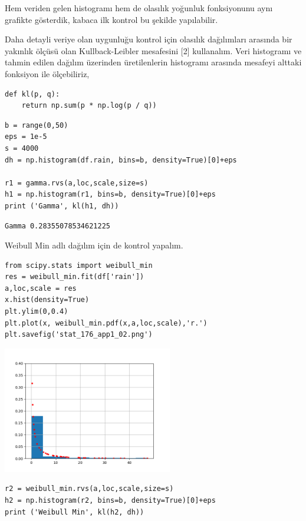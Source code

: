 \documentclass[12pt,fleqn]{article}\usepackage{../../common}
\begin{document}
Hem veriden gelen histogramı hem de olasılık yoğunluk fonksiyonunu aynı
grafikte gösterdik, kabaca ilk kontrol bu şekilde yapılabilir.

Daha detayli veriye olan uygunluğu kontrol için olasılık dağılımları arasında
bir yakınlık ölçüsü olan Kullback-Leibler mesafesini [2] kullanalım. Veri
histogramı ve tahmin edilen dağılım üzerinden üretilenlerin histogramı arasında
mesafeyi alttaki fonksiyon ile ölçebiliriz,

\begin{verbatim}
def kl(p, q):
    return np.sum(p * np.log(p / q))    
\end{verbatim}

\begin{verbatim}
b = range(0,50)
eps = 1e-5
s = 4000
dh = np.histogram(df.rain, bins=b, density=True)[0]+eps

r1 = gamma.rvs(a,loc,scale,size=s)
h1 = np.histogram(r1, bins=b, density=True)[0]+eps
print ('Gamma', kl(h1, dh))
\end{verbatim}

\begin{verbatim}
Gamma 0.28355078534621225
\end{verbatim}

Weibull Min adlı dağılım için de kontrol yapalım.

\begin{verbatim}
from scipy.stats import weibull_min
res = weibull_min.fit(df['rain'])
a,loc,scale = res  
x.hist(density=True)
plt.ylim(0,0.4)
plt.plot(x, weibull_min.pdf(x,a,loc,scale),'r.')
plt.savefig('stat_176_app1_02.png')
\end{verbatim}

\includegraphics[width=20em]{stat_176_app1_02.png}

\begin{verbatim}
r2 = weibull_min.rvs(a,loc,scale,size=s)
h2 = np.histogram(r2, bins=b, density=True)[0]+eps
print ('Weibull Min', kl(h2, dh))
\end{verbatim}
\end{document}
